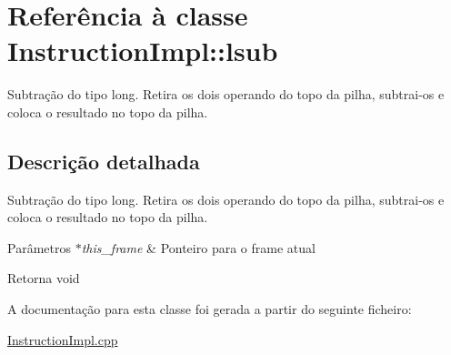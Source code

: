 \hypertarget{class_instruction_impl_1_1lsub}{}\section{Referência à classe Instruction\+Impl\+:\+:lsub}
\label{class_instruction_impl_1_1lsub}


Subtração do tipo long. Retira os dois operando do topo da pilha, subtrai-\/os e coloca o resultado no topo da pilha.  




\subsection{Descrição detalhada}
Subtração do tipo long. Retira os dois operando do topo da pilha, subtrai-\/os e coloca o resultado no topo da pilha. 


\begin{DoxyParams}{Parâmetros}
{\em $\ast$this\+\_\+frame} & Ponteiro para o frame atual \\
\hline
\end{DoxyParams}
\begin{DoxyReturn}{Retorna}
void 
\end{DoxyReturn}


A documentação para esta classe foi gerada a partir do seguinte ficheiro\+:\begin{DoxyCompactItemize}
\item 
\hyperlink{_instruction_impl_8cpp}{Instruction\+Impl.\+cpp}\end{DoxyCompactItemize}
